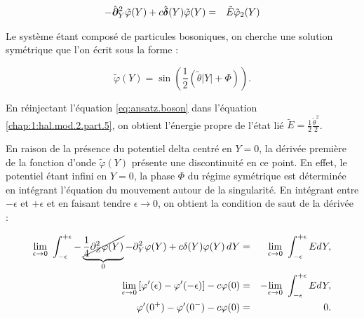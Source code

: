 \begin{eqnarray}\label{chap:1:hal.mod.2.part.5}
	- 	\hat{\bm{\partial}}_Y^2 \tilde{\varphi}(Y) + c \hat{\bm{\delta}} ( Y )\tilde{\varphi}(Y) & = & \tilde{E}\tilde{\varphi}_2(Y) 
\end{eqnarray}

Le système étant composé de particules bosoniques, on cherche une solution symétrique que l’on écrit sous la forme :


\begin{equation}
	\tilde{\varphi}(Y) = \sin\left( \frac{1}{2} (\tilde{\theta} |Y| + \Phi ) \right). \label{eq:ansatz.boson}
\end{equation}

En réinjectant l'équation \eqref{eq:ansatz.boson} dans l’équation \eqref{chap:1:hal.mod.2.part.5}, on obtient l’énergie propre de l’état lié $\tilde{E} = \frac{1}{2}\frac{\tilde{\theta}^2}{2}$.


En raison de la présence du potentiel delta centré en $Y = 0$, la dérivée première de la fonction d’onde $\tilde{\varphi}(Y)$ présente une discontinuité en ce point. En effet, le potentiel étant infini en $Y = 0$, la phase $\Phi$ du régime symétrique est déterminée en intégrant l’équation du mouvement autour de la singularité. En intégrant entre $- \epsilon$ et $+ \epsilon$ et en faisant tendre $\epsilon \to 0$, on obtient la condition de saut de la dérivée :





{\color{gray} 
\begin{eqnarray*}
	\underset{ \epsilon \to 0 }{\lim} \int_{-\epsilon}^{+\epsilon}  	-\underbrace{\cancel{\frac{1}{4} \partial_Z^2\varphi(Y)}}_{0} - 	\partial_Y^2\varphi(Y) + c \delta ( Y )\varphi(Y) \, dY  & = & \underset{ \epsilon \to 0 }{\lim}  \int_{-\epsilon}^{+\epsilon}  E d Y , \\
	\underset{ \epsilon \to 0 }{\lim}  \left [ \varphi'(\epsilon) - \varphi'(-\epsilon) \right ] - c \varphi (  0 ) & =  &  -\underset{ \epsilon \to 0 }{\lim}  \int_{-\epsilon}^{+\epsilon}  E d Y,\\
	 \varphi'(0^+) - \varphi'(0^-) - c \varphi (  0 ) & = & 0 .
\end{eqnarray*}


}

